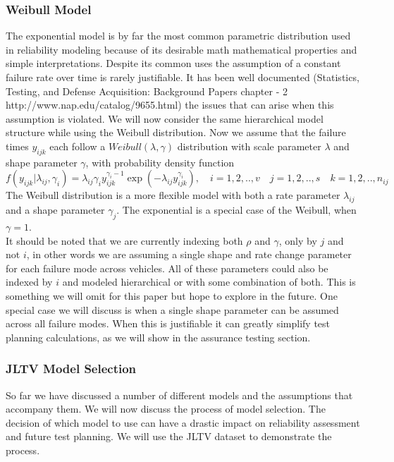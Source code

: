 \documentclass[12pt]{article}
\begin{document}
\subsubsection{Weibull Model}
The exponential model is by far the most common parametric distribution used in
reliability modeling because of its desirable math mathematical properties and
simple interpretations.   Despite its common uses the assumption of a constant
failure rate over time is rarely justifiable.  It has been well documented
(Statistics, Testing, and Defense Acquisition: Background Papers chapter - 2
http://www.nap.edu/catalog/9655.html) the issues that can arise when this
assumption is violated.  We will now consider the same hierarchical model
structure while using the Weibull distribution.  Now we assume that the failure
times $y_{ijk}$ each follow a $Weibull(\lambda, \gamma)$ distribution with scale
parameter $\lambda$ and shape parameter $\gamma$, with probability density
function
\begin{equation}
f(y_{ijk}|\lambda_{ij},\gamma_{i})=\lambda_{ij}\gamma_{i} y_{ijk}^{\gamma_{i}-1}\exp(-\lambda_{ij}
y_{ijk}^{\gamma_{i}}), \quad i = 1,2,..,v \quad j=1,2,..,s \quad k=1,2,..,n_{ij}
\end{equation}
The Weibull distribution is a more flexible model with both a rate parameter
$\lambda_{ij}$ and a shape parameter $\gamma_{j}$.  The exponential is a special
case of the Weibull, when $\gamma = 1$.
\\
It should be noted that we are currently indexing both $\rho$ and $\gamma$, only
by $j$ and not $i$, in other words we are assuming a single shape and rate
change parameter for each failure mode across vehicles.  All of these parameters
could also be indexed by $i$ and modeled hierarchical or with some combination
of both.  This is something we will omit for this paper but hope to explore in
the future.  One special case we will discuss is when a single shape parameter
can be assumed across all failure modes.  When this is justifiable it can
greatly simplify test planning calculations, as we will show in the assurance
testing section.

\subsubsection{JLTV Model Selection}
So far we have discussed a number of different models and the assumptions that
accompany them.  We will now discuss the process of model selection.  The
decision of which model to use can have a drastic impact on reliability
assessment and future test planning.  We will use the JLTV dataset to
demonstrate the process.
\end{document}
